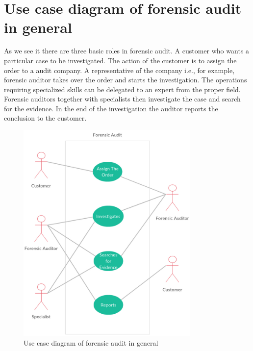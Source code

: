




\section{Use case diagram of forensic audit in general}

As we see it there are three basic roles in forensic audit. A customer who wants a particular case to be investigated. The action of the customer is to assign the order to a audit company. A representative of the company i.e., for example, forensic auditor takes over the order and starts the investigation. The operations requiring specialized skills can be delegated to an expert from the proper field. Forensic auditors together with specialists then investigate the case and search for the evidence. In the end of the investigation the auditor reports the conclusion to the customer. 

\begin{figure}[h]
	\begin{center} 
	\includegraphics[width=0.8\textwidth]{img/usecase/use_case-FA_general2.pdf}
	\end{center}
	\caption{Use case diagram of forensic audit in general}
\end{figure}


